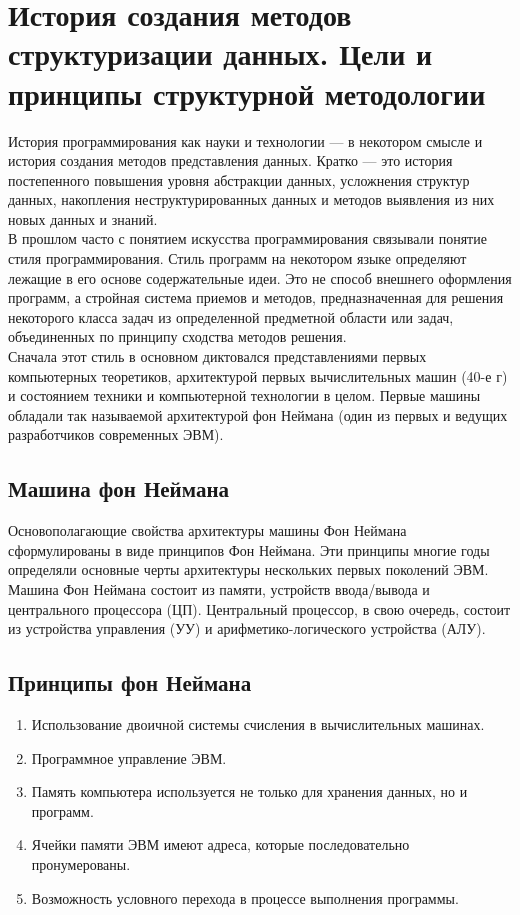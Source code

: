 \documentclass[main]{subfiles}
\begin{document}
    \section{История создания методов структуризации данных. Цели и принципы структурной методологии}
    История программирования как науки и технологии --- в некотором смысле и история создания методов представления данных. Кратко --- это история постепенного повышения уровня абстракции данных, усложнения структур данных, накопления неструктурированных данных и методов выявления из них новых данных и знаний.\\

    В прошлом часто с понятием искусства программирования связывали понятие стиля программирования. Стиль программ на некотором языке определяют лежащие в его основе содержательные идеи. Это не способ внешнего оформления программ, а стройная система приемов и методов, предназначенная для решения некоторого класса задач из определенной предметной области или задач, объединенных по принципу сходства методов решения.\\

    Сначала этот стиль в основном диктовался представлениями первых компьютерных теоретиков, архитектурой первых вычислительных машин (40-е г) и состоянием техники и компьютерной технологии в целом. Первые машины обладали так называемой архитектурой фон Неймана (один из первых и ведущих разработчиков современных ЭВМ).

    \subsection{Машина фон Неймана}
    Основополагающие свойства архитектуры машины Фон Неймана сформулированы в виде принципов Фон Неймана. Эти принципы многие годы определяли основные черты архитектуры нескольких первых поколений ЭВМ. Машина Фон Неймана состоит из памяти, устройств ввода/вывода и центрального процессора (ЦП). Центральный процессор, в свою очередь, состоит из устройства управления (УУ) и арифметико-логического устройства (АЛУ).

    \subsection{Принципы фон Неймана}
    \begin{enumerate}
        \item Использование двоичной системы счисления в вычислительных машинах.
        \item Программное управление ЭВМ.
        \item Память компьютера используется не только для хранения данных, но и программ.
        \item Ячейки памяти ЭВМ имеют адреса, которые последовательно пронумерованы.
        \item Возможность условного перехода в процессе выполнения программы.
    \end{enumerate}
\end{document}
